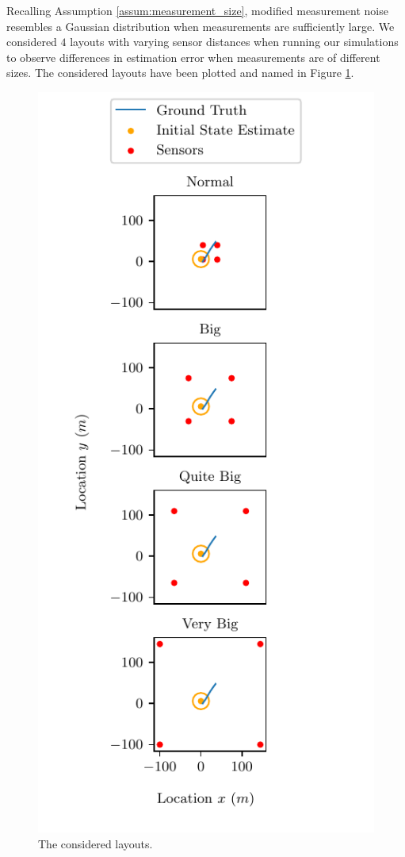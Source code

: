 \documentclass[twocolumn]{autart}
\begin{document}
Recalling Assumption \ref{assum:measurement_size}, modified measurement noise resembles a Gaussian distribution when measurements are sufficiently large. We considered $4$ layouts with varying sensor distances when running our simulations to observe differences in estimation error when measurements are of different sizes. The considered layouts have been plotted and named in Figure \ref{fig:sim_layouts}.
\begin{figure}[htbp]
\begin{center}
    \includegraphics{images/layouts.pdf}
\end{center}
\caption{The considered layouts.}
\label{fig:sim_layouts}
\end{figure}
\end{document}
